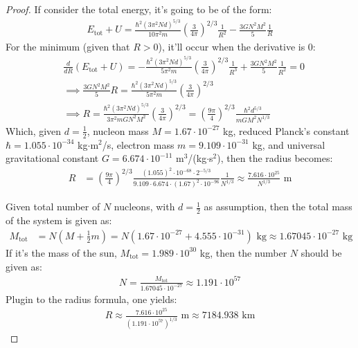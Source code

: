 \documentclass{article}
\begin{document}
\begin{proof}
    \item[(c)] If consider the total energy, it's going to be of the form:
    \begin{align}
        E_\text{tot}+U = \frac{\hbar^2(3\pi^2 Nd)^{5/3}}{10\pi^2 m}\left(\frac{3}{4\pi}\right)^{2/3}\frac{1}{R^2} - \frac{3GN^2M^2}{5}\frac{1}{R}
    \end{align}
    For the minimum (given that $R>0$), it'll occur when the derivative is $0$:
    \begin{align}
        &\frac{d}{dR}(E_\text{tot}+U) = -\frac{\hbar^2(3\pi^2 N d)^{5/3}}{5\pi^2 m}\left(\frac{3}{4\pi}\right)^{2/3}\frac{1}{R^3}+\frac{3GN^2M^2}{5}\frac{1}{R^2} = 0\\
        &\implies\frac{3GN^2M^2}{5}R = \frac{\hbar^2(3\pi^2Nd)^{5/3}}{5\pi^2 m}\left(\frac{3}{4\pi}\right)^{2/3}\\
        &\implies R = \frac{\hbar^2(3\pi^2 Nd)^{5/3}}{3\pi^2 mGN^2M^2}\left(\frac{3}{4\pi}\right)^{2/3} = \left(\frac{9\pi}{4}\right)^{2/3}\frac{\hbar^2 d^{5/3}}{mGM^2N^{1/3}}
    \end{align}
    Which, given $d=\frac{1}{2}$, nucleon mass $M=1.67\cdot 10^{-27}$ kg, reduced Planck's constant $\hbar = 1.055\cdot 10^{-34}$ kg$\cdot$m$^2$/s, electron mass $m=9.109\cdot 10^{-31}$ kg, and universal gravitational constant $G = 6.674\cdot 10^{-11}$ m$^3$/(kg$\cdot$s$^2$), then the radius becomes:
    \begin{align}
        R &= \left(\frac{9\pi}{4}\right)^{2/3}\frac{(1.055)^2\cdot 10^{-68}\cdot 2^{-5/3}}{9.109\cdot 6.674 \cdot (1.67)^2\cdot 10^{-96}}\frac{1}{N^{1/3}} \approx \frac{7.616\cdot 10^{25}}{N^{1/3}} \text{ m}
    \end{align}

    \hfil

    \item[(d)] Given total number of $N$ nucleons, with $d=\frac{1}{2}$ as assumption, then the total mass of the system is given as:
    \begin{align}
        M_\text{tot} &= N\left(M+\frac{1}{2}m\right) = N\left(1.67\cdot 10^{-27}+4.555\cdot 10^{-31}\right)\text{ kg}\approx 1.67045\cdot 10^{-27}\text{ kg}
    \end{align}
    If it's the mass of the sun, $M_\text{tot} = 1.989\cdot 10^{30}$ kg, then the number $N$ should be given as:
    \begin{align}
        N = \frac{M_\text{tot}}{1.67045\cdot 10^{-27}}\approx 1.191\cdot 10^{57}
    \end{align}
    Plugin to the radius formula, one yields:
    \begin{align}
        R \approx \frac{7.616\cdot 10^{25}}{(1.191\cdot 10^{57})^{1/3}}\text{ m}\approx 7184.938\text{ km}
    \end{align}


\end{proof}
\end{document}
